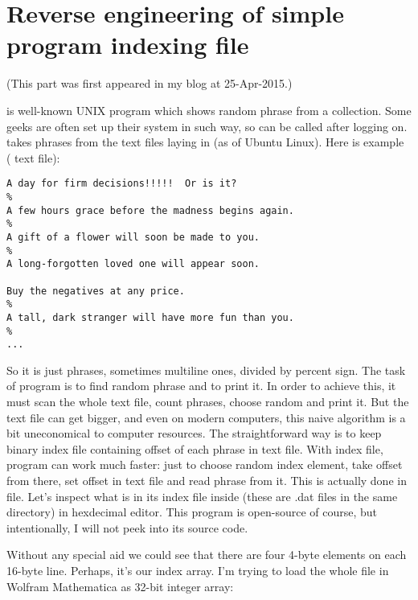 \section[\IT{fortune} program indexing file]{Reverse engineering of simple  program indexing file}

(This part was first appeared in my blog at 25-Apr-2015.)

 is well-known UNIX program which shows random phrase from a collection.
Some geeks are often set up their system in such way, so  can be called after logging on.
 takes phrases from the text files laying in  (as of Ubuntu Linux).
Here is example ( text file):

\begin{lstlisting}
A day for firm decisions!!!!!  Or is it?
%
A few hours grace before the madness begins again.
%
A gift of a flower will soon be made to you.
%
A long-forgotten loved one will appear soon.

Buy the negatives at any price.
%
A tall, dark stranger will have more fun than you.
%
...
\end{lstlisting}

So it is just phrases, sometimes multiline ones, divided by percent sign.
The task of  program is to find random phrase and to print it.
In order to achieve this, it must scan the whole text file, count phrases, choose random and print it.
But the text file can get bigger, and even on modern computers, this naive algorithm is a bit uneconomical to computer resources.
The straightforward way is to keep binary index file containing offset of each phrase in text file.
With index file,  program can work much faster: just to choose random index element, take offset from there, set offset in text file and read phrase from it.
This is actually done in  file.
Let's inspect what is in its index file inside (these are .dat files in the same directory) in hexdecimal editor.
This program is open-source of course, but intentionally, I will not peek into its source code.



Without any special aid we could see that there are four 4-byte elements on each 16-byte line.
Perhaps, it's our index array.
I'm trying to load the whole file in Wolfram Mathematica as 32-bit integer array:

